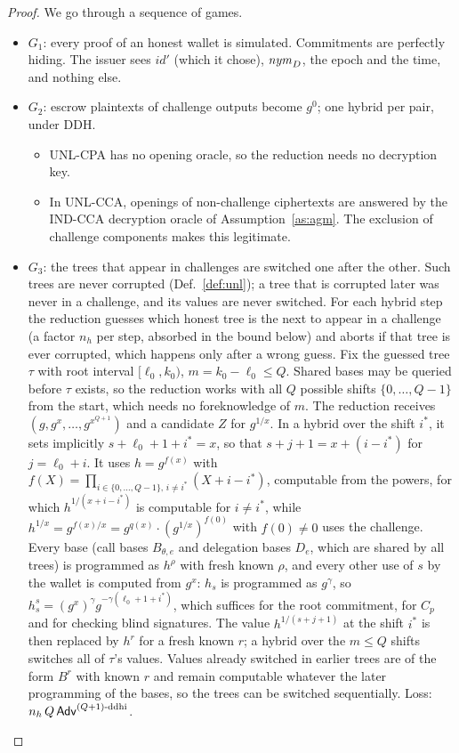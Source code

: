 \begin{proof}
We go through a sequence of games.
\begin{itemize}[leftmargin=*]
\item $G_1$: every proof of an honest wallet is simulated. Commitments are perfectly hiding. The issuer sees $\mathit{id}'$ (which it chose), $\mathit{nym}_D$, the epoch and the time, and nothing else.
\item $G_2$: escrow plaintexts of challenge outputs become $g^0$; one hybrid per pair, under DDH.
  \begin{itemize}[leftmargin=*]
  \item UNL-CPA has no opening oracle, so the reduction needs no decryption key.
  \item In UNL-CCA, openings of non-challenge ciphertexts are answered by the IND-CCA decryption oracle of Assumption~\ref{as:agm}. The exclusion of challenge components makes this legitimate.
  \end{itemize}
\item $G_3$: the trees that appear in challenges are switched one after the other. Such trees are never corrupted (Def.~\ref{def:unl}); a tree that is corrupted later was never in a challenge, and its values are never switched. For each hybrid step the reduction guesses which honest tree is the next to appear in a challenge (a factor $n_h$ per step, absorbed in the bound below) and aborts if that tree is ever corrupted, which happens only after a wrong guess. Fix the guessed tree $\tau$ with root interval $[\ell_0,k_0)$, $m=k_0-\ell_0\le Q$. Shared bases may be queried before $\tau$ exists, so the reduction works with all $Q$ possible shifts $\{0,\dots,Q-1\}$ from the start, which needs no foreknowledge of $m$. The reduction receives $(g,g^{x},\dots,g^{x^{Q+1}})$ and a candidate $Z$ for $g^{1/x}$. In a hybrid over the shift $i^*$, it sets implicitly $s+\ell_0+1+i^*=x$, so that $s+j+1=x+(i-i^*)$ for $j=\ell_0+i$. It uses $h=g^{f(x)}$ with $f(X)=\prod_{i\in\{0,\dots,Q-1\},\,i\neq i^*}(X+i-i^*)$, computable from the powers, for which $h^{1/(x+i-i^*)}$ is computable for $i\neq i^*$, while $h^{1/x}=g^{f(x)/x}=g^{q(x)}\cdot(g^{1/x})^{f(0)}$ with $f(0)\neq0$ uses the challenge. Every base (call bases $B_{\theta,e}$ and delegation bases $D_e$, which are shared by all trees) is programmed as $h^{\rho}$ with fresh known $\rho$, and every other use of $s$ by the wallet is computed from $g^{x}$: $h_s$ is programmed as $g^{\gamma}$, so $h_s^{s}=(g^{x})^{\gamma}g^{-\gamma(\ell_0+1+i^*)}$, which suffices for the root commitment, for $C_p$ and for checking blind signatures. The value $h^{1/(s+j+1)}$ at the shift $i^*$ is then replaced by $h^{r}$ for a fresh known $r$; a hybrid over the $m\le Q$ shifts switches all of $\tau$'s values. Values already switched in earlier trees are of the form $B^{r}$ with known $r$ and remain computable whatever the later programming of the bases, so the trees can be switched sequentially. Loss: $n_h\,Q\,\mathsf{Adv}^{(Q+1)\text{-ddhi}}$.

\end{itemize}
\end{proof}
